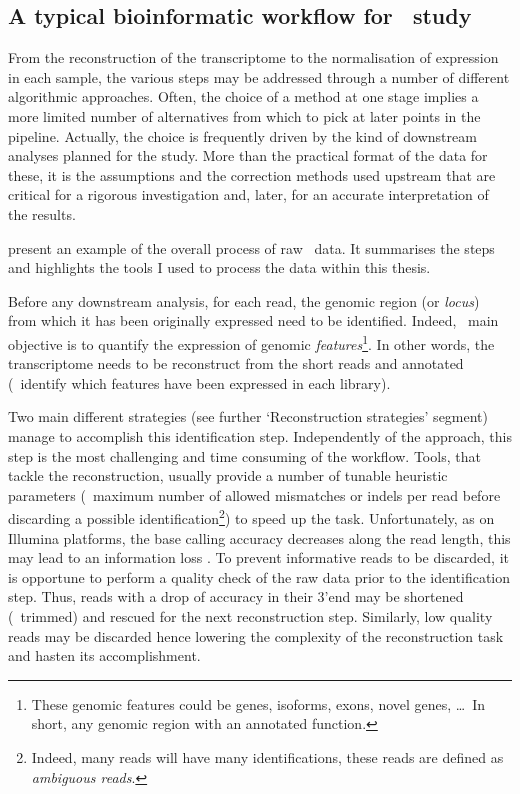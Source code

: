 \subsection{A typical bioinformatic workflow for \Rnaseq\ study}

From the reconstruction of the
transcriptome to the normalisation of expression in each sample, the various
steps may be addressed through a number of different algorithmic approaches.
Often, the choice of a method at one stage implies a more limited number of
alternatives from which to pick at later points in the pipeline. Actually,
the choice is frequently driven by the kind of downstream analyses planned for
the study. More than the practical format of the data for these, it is the
assumptions and the correction methods used upstream that are critical for a
rigorous investigation and, later, for an accurate interpretation of the results.

 present an example of the overall 
process of raw \Rnaseq\ data. It summarises the steps and highlights the tools
I used to process the data within this thesis.

Before any downstream analysis, for each read, the genomic region (or
\emph{locus}) from which it has been originally expressed need to be identified.
Indeed, \Rnaseq\ main objective is to quantify the expression of genomic
\emph{features}\footnote{These genomic features could be genes, isoforms,
exons, novel genes, \dots\
In short, any genomic region with an annotated function.}. In other words,
the transcriptome needs to be reconstruct from the short reads and annotated
(\ie\ identify which features have been expressed in each library).

Two main different strategies (see further `Reconstruction strategies' segment)
manage to accomplish this identification step. Independently of the
approach, this step is the most challenging and time consuming
of the workflow. Tools, that tackle the reconstruction, usually provide a
number of tunable heuristic parameters (\eg\ maximum number of allowed mismatches
or indels per read before discarding a possible identification\footnote{Indeed,
many reads will have many identifications, these reads are defined as
\emph{ambiguous reads}.})
to speed up the task.
Unfortunately, as on Illumina platforms, the base calling accuracy decreases
along the read length, this may lead to an information loss .
To prevent informative reads to be discarded, it is opportune to perform a quality
check of the raw data prior to the identification step. Thus, reads with a drop of
accuracy in their 3'end may be shortened (\ie\ trimmed) and rescued for the next
reconstruction step. Similarly, low quality reads may be discarded hence
lowering the complexity
of the reconstruction task and hasten its accomplishment.

